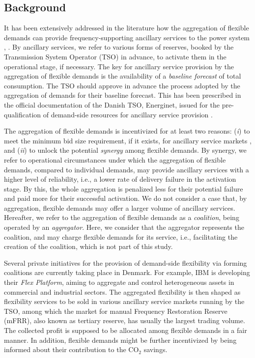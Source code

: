 \documentclass[conference]{IEEEtran}
\begin{document}
\subsection{Background}
It has been extensively addressed in the literature how the aggregation of flexible demands can provide frequency-supporting ancillary services to the power system \cite{biegel2014value}, \cite{macdonald2020demand}. By ancillary services, we refer to various forms of reserves, booked by the Transmission System Operator (TSO) in advance, to activate them in the operational stage, if necessary. The key for ancillary service provision by the aggregation of flexible demands is the availability of a \textit{baseline forecast} of total consumption. The TSO should approve in advance the process adopted by the aggregation of demands for their baseline forecast. This has been prescribed in the official documentation of the Danish TSO, Energinet, issued for the pre-qualification of demand-side resources for ancillary service provision \cite{energinet:prequalification}.

The aggregation of flexible demands is incentivized for at least two reasons: (\textit{i}) to meet the minimum bid size requirement, if it exists, for ancillary service markets \cite{energinet:Systemydelser}, and (\textit{ii}) to unlock the potential \textit{synergy} among flexible demands. By synergy, we refer to operational circumstances under which the aggregation of flexible demands, compared to individual demands, may provide ancillary services with a higher level of reliability, i.e., a lower rate of delivery failure in the activation stage. By this, the whole aggregation is penalized less for their potential failure and paid more for their successful activation. We do not consider a case that, by aggregation, flexible demands may offer a larger volume of ancillary services. Hereafter, we refer to the aggregation of flexible demands as a \textit{coalition}, being operated by an \textit{aggregator}. Here, we consider that the aggregator represents the coalition, and may charge flexible demands for its service, i.e., facilitating the creation of the coalition, which is not part of this study.

Several private initiatives for the provision of demand-side flexibility via forming coalitions are currently taking place in Denmark. For example, IBM is developing their \textit{Flex Platform}, aiming to aggregate and control heterogeneous assets in commercial and industrial sectors. The aggregated flexibility is then shaped as flexibility services to be sold in various ancillary service markets running by the TSO, among which the market for manual Frequency Restoration Reserve (mFRR), also known as tertiary reserve, has usually the largest trading volume. The collected profit is supposed to be allocated among flexible demands in a fair manner. In addition, flexible demands might be further incentivized by being informed about their contribution to the CO$_{2}$ savings.
\end{document}
